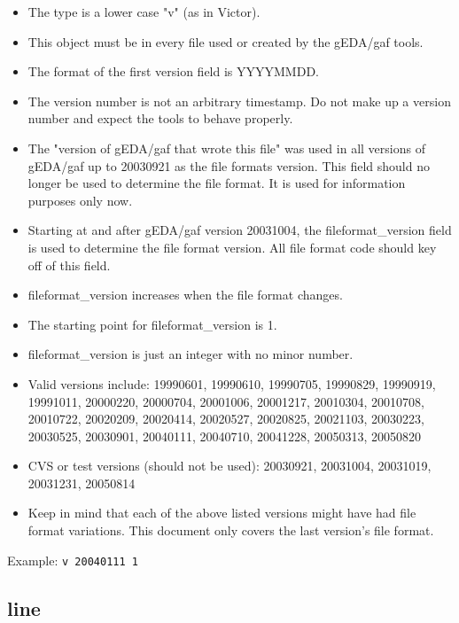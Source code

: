 \documentclass{article}
\begin{document}
\begin{itemize}
\item The type is a lower case "v" (as in Victor).
\item This object must be in every file used or created by the gEDA/gaf tools.
\item The format of the first version field is YYYYMMDD.  
\item The version number is not an arbitrary timestamp.  Do not make up a 
      version number and expect the tools to behave properly.  
\item The "version of gEDA/gaf that wrote this file" was used in all versions of gEDA/gaf up to 20030921 as the file formats version.  This field should no longer be used to determine the file format.  It is used for information purposes only now. 
\item Starting at and after gEDA/gaf version 20031004, the fileformat\_version field is used to determine the file format version.  All file format code should key off of this field.
\item fileformat\_version increases when the file format changes.
\item The starting point for fileformat\_version is 1.
\item fileformat\_version is just an integer with no minor number.

\item Valid versions include: 
19990601, 19990610, 19990705, 19990829, 19990919, 19991011, 20000220, 20000704,
20001006, 20001217, 20010304, 20010708, 20010722, 20020209, 20020414, 20020527,
20020825, 20021103, 20030223, 20030525, 20030901, 20040111, 20040710, 20041228,
20050313, 20050820

\item CVS or test versions (should not be used): 
20030921, 20031004, 20031019, 20031231, 20050814

\item Keep in mind that each of the above listed versions might have had 
file format variations.  This document only covers the last version's file 
format.

\end{itemize}

Example: \newline
{\tt v 20040111 1}


\subsection{line}
\end{document}
